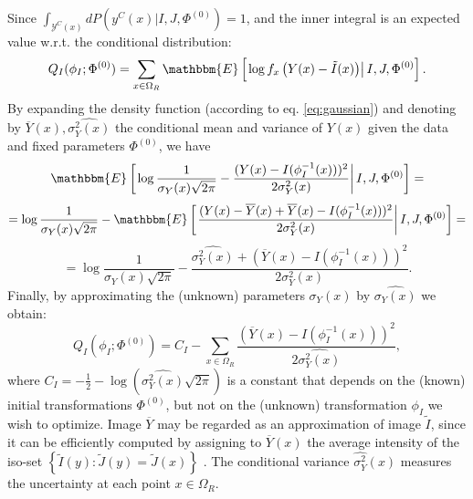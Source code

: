Since \hbox{$\int_{\mathcal{Y}^{C}(x)}dP(y^{C}(x) | I, J, \Phi^{(0)}) = 1$}, and the inner integral
is an expected value w.r.t. the conditional distribution:
\begin{equation}
     Q_{I}(\phi_{I} ; \Phi^{(0)}) = \sum_{x\in\Omega_{R}} \mathbbm{E} \left[\left.\log f_{x}\left(Y(x) - \tilde{I}(x)\right) \right| I, J, \Phi^{(0)}\right].
\end{equation}
By expanding the density function (according to eq. \eqref{eq:gaussian}) and denoting by $\overline{Y}(x), \widehat{\sigma^{2}_{Y}(x)}$ the conditional mean and variance of $Y(x)$
given the data and fixed parameters $\Phi^{(0)}$, we have
\begin{equation}
    \mathbbm{E} \left[\left.\log \frac{1}{\sigma_{Y}(x)\sqrt{2\pi}} - \frac{(Y(x) - I(\phi^{-1}_{I}(x)))^{2}}{2\sigma^{2}_{Y}(x)}\right|I, J, \Phi^{(0)} \right] =
\end{equation}
\begin{equation}
    = \log \frac{1}{\sigma_{Y}(x)\sqrt{2\pi}} - \mathbbm{E} \left[\left. \frac{(Y(x) - \overline{Y}(x) + \overline{Y}(x) - I(\phi^{-1}_{I}(x)))^{2}}{2\sigma^{2}_{Y}(x)}\right|I, J, \Phi^{(0)} \right]=
\end{equation}
\begin{equation}
    = \log \frac{1}{\sigma_{Y}(x)\sqrt{2\pi}} - \frac{\widehat{\sigma^{2}_{Y}(x)} + (\overline{Y}(x) - I(\phi^{-1}_{I}(x)))^{2}}{2\sigma^{2}_{Y}(x)}.
\end{equation}
Finally, by approximating the (unknown) parameters $\sigma_{Y}(x)$ by $\widehat{\sigma_{Y}(x)}$ we obtain:
\begin{equation}\label{eq:arce_em_metric}
    Q_{I}(\phi_{I} ; \Phi^{(0)}) = C_{I} - \sum_{x\in\Omega_{R}}\frac{(\overline{Y}(x) - I(\phi^{-1}_{I}(x)))^{2}}{2\widehat{\sigma^{2}_{Y}(x)}},
\end{equation}
where $C_{I} = -\frac{1}{2} - \log\left(\widehat{\sigma^{2}_{Y}(x)}\sqrt{2\pi}\right)$ is a constant that depends on the (known) initial transformations $\Phi^{(0)}$, but not on the (unknown) transformation $\phi_{I}$ we wish to optimize. Image $\overline{Y}$ may be regarded as an approximation of image $\tilde{I}$, since it can be efficiently computed by assigning to $\overline{Y}(x)$ the average intensity of the iso-set $\left\lbrace \tilde{I}(y) : \tilde{J}(y) = \tilde{J}(x)\right\rbrace$ \citep{Roche1998}. The conditional variance $\widehat{\sigma^{2}_{Y}}(x)$ measures the uncertainty at each point $x\in \Omega_{R}$.\\

